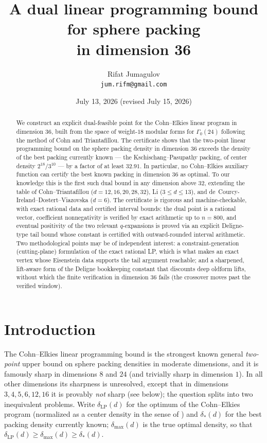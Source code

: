\documentclass[11pt]{article}
\title{A dual linear programming bound for sphere packing\\ in dimension 36}
\author{Rifat Jumagulov\\ \texttt{jum.rifm@gmail.com}}
\date{July 13, 2026 (revised July 15, 2026)}
\theoremstyle{remark}
\newcommand{\LP}{\mathrm{LP}}
\begin{document}
\maketitle

\begin{abstract}
We construct an explicit dual-feasible point for the Cohn--Elkies linear
program in dimension $36$, built from the space of weight-$18$ modular
forms for $\Gamma_0(24)$ following the method of Cohn and Triantafillou.
The certificate shows that the two-point linear programming bound on the
sphere packing density in dimension $36$ exceeds the density of the best
packing currently known --- the Kschischang--Pasupathy packing, of center
density $2^{18}/3^{10}$ --- by a factor of at least $32.91$. In
particular, no Cohn--Elkies auxiliary function can certify the best known
packing in dimension $36$ as optimal. To our knowledge this is the first
such dual bound in any dimension above $32$, extending the table of
Cohn--Triantafillou ($d=12,16,20,28,32$), Li ($3\le d\le 13$), and
de~Courcy-Ireland--Dostert--Viazovska ($d=6$). The certificate is
rigorous and machine-checkable, with exact rational data and certified
interval bounds: the dual point is a rational vector, coefficient
nonnegativity is verified by exact arithmetic up to $n=800$, and
eventual positivity of
the two relevant $q$-expansions is proved via an explicit Deligne-type
tail bound whose constant is certified with outward-rounded interval
arithmetic. Two methodological points may be of independent interest: a
constraint-generation (cutting-plane) formulation of the exact rational
LP, which is what makes an exact vertex whose Eisenstein data supports
the tail argument reachable; and a sharpened, lift-aware form of the
Deligne bookkeeping constant that discounts deep oldform lifts, without
which the finite verification in dimension $36$ fails (the crossover
moves past the verified window).
\end{abstract}

\section{Introduction}\label{sec:intro}

The Cohn--Elkies linear programming bound \cite{CohnElkies} is the
strongest known general \emph{two-point} upper bound on sphere packing
densities in moderate dimensions, and it is famously sharp in dimensions $8$ and $24$
\cite{Viazovska,CKMRV} (and trivially sharp in dimension $1$). In
all other dimensions its sharpness is unresolved, except that in
dimensions $3,4,5,6,12,16$ it is provably \emph{not} sharp (see below);
the question splits into two inequivalent problems. Write
$\delta_{\LP}(d)$ for the optimum of the Cohn--Elkies program
(normalized as a center density in the sense of \cite{ConwaySloane})
and $\delta_*(d)$ for the best packing density currently known;
$\delta_{\max}(d)$ is the true optimal density, so that
$\delta_{\LP}(d)\ge\delta_{\max}(d)\ge\delta_*(d)$.
\end{document}
